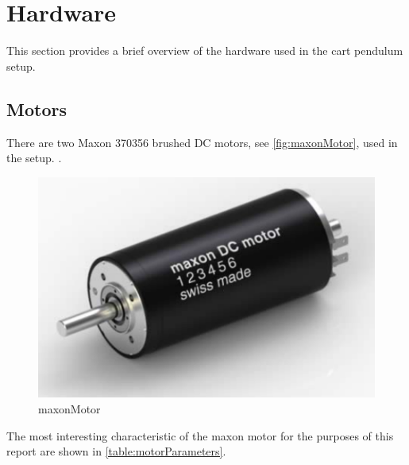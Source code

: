 \section{Hardware}\label{sec:hardware}
This section provides a brief overview of the hardware used in the cart pendulum setup.

\subsection{Motors}
There are two Maxon 370356 brushed DC motors, see \autoref{fig:maxonMotor}, used in the setup. .


\begin{figure}[H]
  \includegraphics[width=.26\textwidth]{figures/maxonMotor}
  \caption{maxonMotor}
  \label{fig:maxonMotor}
\end{figure}

The most interesting characteristic of the maxon motor for the purposes of this report are shown in \autoref{table:motorParameters}.

